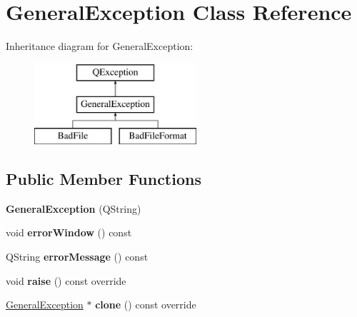 \hypertarget{classGeneralException}{\section{General\-Exception Class Reference}
\label{classGeneralException}
}
Inheritance diagram for General\-Exception\-:\begin{figure}[H]
\begin{center}
\leavevmode
\includegraphics[height=3.000000cm]{classGeneralException}
\end{center}
\end{figure}
\subsection*{Public Member Functions}
\begin{DoxyCompactItemize}
\item 
\hypertarget{classGeneralException_a7185932f70f1e7cae580747ebb51c241}{{\bfseries General\-Exception} (Q\-String)}\label{classGeneralException_a7185932f70f1e7cae580747ebb51c241}

\item 
\hypertarget{classGeneralException_a5facd2adb3adc03412e419d9e2765cb7}{void {\bfseries error\-Window} () const }\label{classGeneralException_a5facd2adb3adc03412e419d9e2765cb7}

\item 
\hypertarget{classGeneralException_a175f8aa9d4f222fead2fe1b7e39f0835}{Q\-String {\bfseries error\-Message} () const }\label{classGeneralException_a175f8aa9d4f222fead2fe1b7e39f0835}

\item 
\hypertarget{classGeneralException_af8601a8d992b3d3b41675d428ac13eaa}{void {\bfseries raise} () const override}\label{classGeneralException_af8601a8d992b3d3b41675d428ac13eaa}

\item 
\hypertarget{classGeneralException_a328d69ca63d187ba0ae4d07f493e47c4}{\hyperlink{classGeneralException}{General\-Exception} $\ast$ {\bfseries clone} () const override}\label{classGeneralException_a328d69ca63d187ba0ae4d07f493e47c4}

\end{DoxyCompactItemize}
